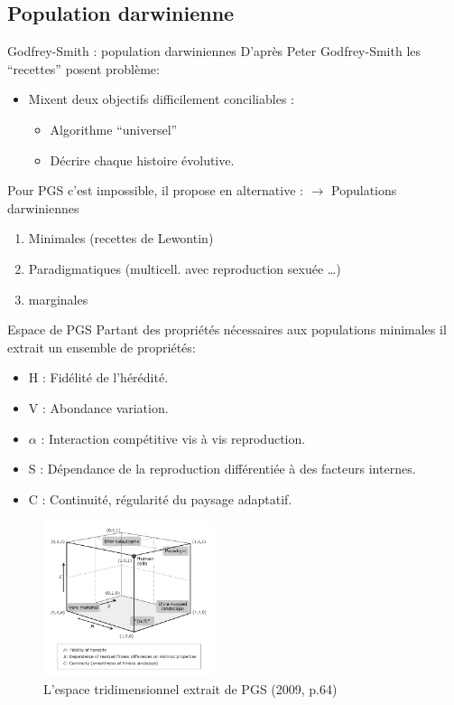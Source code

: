 \documentclass[8pt]{beamer}
\begin{document}
\subsection{Population darwinienne}
\begin{frame}{Godfrey-Smith : population darwiniennes}
	D'après Peter Godfrey-Smith les ``recettes'' posent problème:
	\vfil
	\begin{itemize}
		\item Mixent deux objectifs difficilement conciliables :
			\begin{itemize}
				\item Algorithme ``universel''
				\item Décrire chaque histoire évolutive.
			\end{itemize}
	\end{itemize}
	\vfill
	Pour PGS c'est impossible, il propose en alternative :
	$\rightarrow$ Populations darwiniennes 
	\begin{enumerate}
		\item Minimales (recettes de Lewontin)
		\item Paradigmatiques (multicell. avec reproduction sexuée \ldots )
		\item marginales
	\end{enumerate}

\end{frame}

\begin{frame}{Espace de PGS}
	Partant des propriétés nécessaires aux populations minimales il extrait un ensemble de propriétés:
	\begin{itemize}
		\item H : Fidélité de l'hérédité.
		\item V : Abondance variation.
		\item $\alpha$ : Interaction compétitive vis à vis reproduction.
		\item S : Dépendance de la reproduction différentiée à des facteurs internes.
		\item C : Continuité, régularité du paysage adaptatif.
	\end{itemize}
	\vfil
	
	\begin{figure}[h]
		\begin{center}
			\includegraphics[width=5cm]{./images/PGS.png}
		\end{center}
		\caption{L'espace tridimensionnel extrait de PGS (2009, p.64)}
		\label{fig:PGS}
	\end{figure}
\end{frame}
\end{document}
